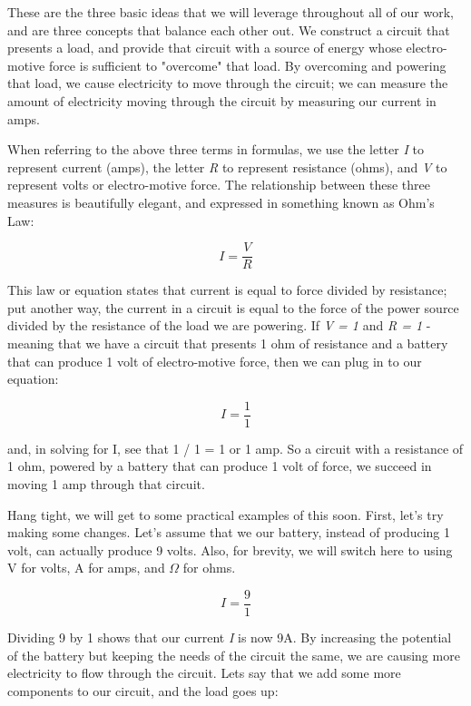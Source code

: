 These are the three basic ideas that we will leverage throughout all of our work, and are three concepts that balance each other out. We construct a circuit that presents a load, and provide that circuit with a source of energy whose electro-motive force is sufficient to "overcome" that load. By overcoming and powering that load, we cause electricity to move through the circuit; we can measure the amount of electricity moving through the circuit by measuring our current in amps.

When referring to the above three terms in formulas, we use the letter \textit{I} to represent current (amps), the letter \textit{R} to represent resistance (ohms), and \textit{V} to represent volts or electro-motive force. The relationship between these three measures is beautifully elegant, and expressed in something known as Ohm's Law:

\begin{equation}
I = \frac{V}{R}
\end{equation}

This law or equation states that current is equal to force divided by resistance; put another way, the current in a circuit is equal to the force of the power source divided by the resistance of the load we are powering. If \textit{V = 1} and \textit{R = 1} - meaning that we have a circuit that presents 1 ohm of resistance and a battery that can produce 1 volt of electro-motive force, then we can plug in to our equation:

\begin{equation}
I = \frac{1}{1}
\end{equation}

and, in solving for I, see that 1 / 1 = 1 or 1 amp. So a circuit with a resistance of 1 ohm, powered by a battery that can produce 1 volt of force, we succeed in moving 1 amp through that circuit. 

Hang tight, we will get to some practical examples of this soon. First, let's try making some changes. Let's assume that we our battery, instead of producing 1 volt, can actually produce 9 volts. Also, for brevity, we will switch here to using V for volts, A for amps, and  $\Omega$ for ohms.

\begin{equation}
I = \frac{9}{1}
\end{equation}

Dividing 9 by 1 shows that our current \textit{I} is now 9A. By increasing the potential of the battery but keeping the needs of the circuit the same, we are causing more electricity to flow through the circuit. Lets say that we add some more components to our circuit, and the load goes up:

